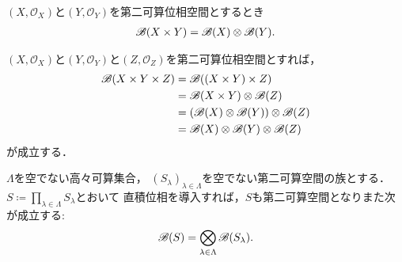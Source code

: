 	\begin{prf}
		
	\end{prf}
	
	\begin{screen}
		\begin{thm}[第二可算空間のCartesian積のBorel集合族]
		\label{thm:Borel_algebra_of_Cartesianproducts_of_second_countable_spaces}
			$(X,\mathscr{O}_X)$と$(Y,\mathscr{O}_Y)$を第二可算位相空間とするとき
			\begin{align}
				\mathscr{B}(X \times Y) = \mathscr{B}(X) \otimes \mathscr{B}(Y).
			\end{align}
		\end{thm}
	\end{screen}
	
	\begin{sketch}
		
	\end{sketch}
	
	$(X,\mathscr{O}_X)$と$(Y,\mathscr{O}_Y)$と$(Z,\mathscr{O}_Z)$を第二可算位相空間とすれば，
	\begin{align}
		\mathscr{B}(X \times Y \times Z) &= \mathscr{B}((X \times Y) \times Z) \\
		&= \mathscr{B}(X \times Y) \otimes \mathscr{B}(Z) \\
		&= \left(\mathscr{B}(X) \otimes \mathscr{B}(Y)\right) \otimes \mathscr{B}(Z) \\
		&= \mathscr{B}(X) \otimes \mathscr{B}(Y) \otimes \mathscr{B}(Z)
	\end{align}
	が成立する．
	
	\begin{screen}
		\begin{thm}[第二可算空間の直積のBorel集合族]\label{thm:Borel_algebra_of_products_of_second_countable_spaces}
			$\Lambda$を空でない高々可算集合，
			$(S_\lambda)_{\lambda \in \Lambda}$を空でない第二可算空間の族とする．
			$S \coloneqq \prod_{\lambda \in \Lambda} S_\lambda$とおいて
			直積位相を導入すれば，$S$も第二可算空間となりまた次が成立する:
			\begin{align}
				\mathscr{B}(S) = \bigotimes_{\lambda \in \Lambda} \mathscr{B}(S_\lambda).
				\label{eq:lem1_for_chap_1_exercise_1_8_1}
			\end{align}
		\end{thm}
	\end{screen}

